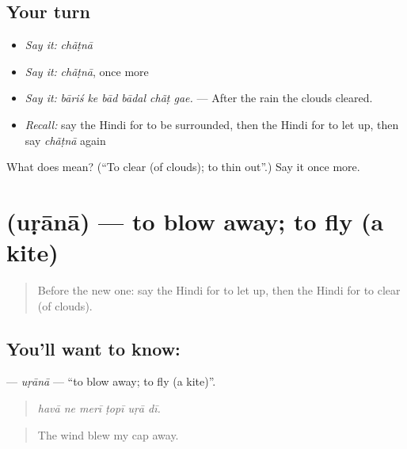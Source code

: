 \subsection*{Your turn}
\begin{itemize}
\raggedright
  \item \emph{Say it:} \emph{chãṭnā}
  \item \emph{Say it:} \emph{chãṭnā}, once more
  \item \emph{Say it:} \emph{bāriś ke bād bādal chãṭ gae.} — After the rain the clouds cleared.
  \item \emph{Recall:} say the Hindi for to be surrounded, then the Hindi for to let up, then say \emph{chãṭnā} again
\end{itemize}

\begin{tcolorbox}[breakable,colback=teal!4,colframe=teal!35!black,title={Before you move on}]
What does  mean? (\textquotedblleft{}To clear (of clouds); to thin out\textquotedblright{}.) Say it once more.
\end{tcolorbox}
\section[\texorpdfstring{\hi{उड़ाना} (uṛānā)}{उड़ाना (uṛānā)}]{ (uṛānā) — to blow away; to fly (a kite)}

\label{lesson:HI-C440-urana}



\begin{quote}
Before the new one: say the Hindi for to let up, then the Hindi for to clear (of clouds).
\end{quote}

\subsection*{You'll want to know: }
\textbf{} — \emph{uṛānā} — \textquotedblleft{}to blow away; to fly (a kite)\textquotedblright{}.

\begin{quote}
     
\end{quote}

\begin{quote}
\emph{havā ne merī ṭopī uṛā dī.}
\end{quote}

\begin{quote}
The wind blew my cap away.
\end{quote}


